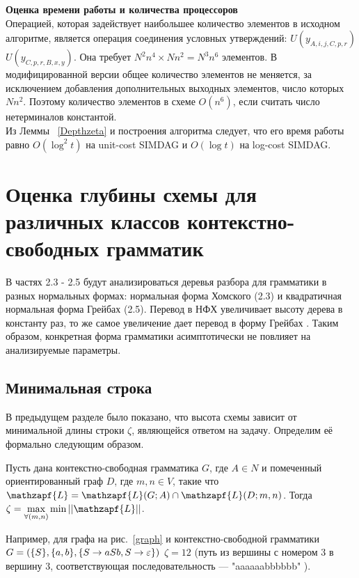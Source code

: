 \textbf {Оценка  времени работы и количества процессоров}
\\Операцией, которая задействует наибольшее количество элементов в исходном алгоритме, является операция соединения условных утверждений: \textit{$U(y_{A,i,j,C,p,r})$} \text{$ \land $} \textit{$U(y_{C,p,r,B,x,y})$}. Она требует $N^2n^4 \times Nn^2 = N^3n^6$ элементов. В модифицированной версии общее количество элементов не меняется, за исключением добавления дополнительных выходных элементов, число которых $Nn^2$. Поэтому количество элементов в схеме $O(n^6)$, если считать число нетерминалов константой.
\\Из Леммы ~\ref{Depthzeta} и построения алгоритма следует, что его время работы равно $O(\log^2t)$ на unit-cost SIMDAG и $O(\log t)$ на log-cost SIMDAG.

\section {Оценка глубины схемы для различных классов контекстно-свободных грамматик}В частях 2.3 - 2.5 будут анализироваться деревья разбора для грамматики в разных нормальных формах: нормальная форма Хомского (2.3) и квадратичная нормальная форма Грейбах (2.5). Перевод в НФХ увеличивает высоту дерева в константу раз, то же самое увеличение дает перевод в форму Грейбах \cite{Kelemenova}. Таким образом, конкретная форма грамматики асимптотически не повлияет на анализируемые параметры.
\subsection{Минимальная строка}
В предыдущем разделе было показано, что высота схемы зависит от минимальной длины строки $\zeta$, являющейся ответом на задачу. Определим её формально  следующим образом.

Пусть дана контекстно-свободная грамматика $G$, где $A \in N$  и помеченный ориентированный граф $D$, где $m, n \in V$, такие что  $\mathzapf{L} = \mathzapf{L}(G; A) \cap  \mathzapf{L}(D; m, n)$. Тогда $\zeta = \max\limits_{\forall(m,n)}\min ||\mathzapf{L}||$.

Например, для графа на рис.~\ref{graph} и контекстно-свободной грамматики $G = (\{S\}, \{a, b\},\\ \{S \rightarrow aSb,
S \rightarrow \varepsilon\})$ $\zeta = 12$ (путь из вершины с номером 3 в вершину 3, соответствующая последовательность  --- "aaaaaabbbbbb" ).

